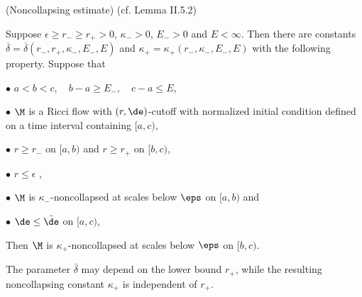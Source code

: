 \begin{lemma}
  \label{lem:kl-establishing-noncollapsing-presence-surgery-existence-kappa-solutions}
(Noncollapsing estimate) (cf. Lemma II.5.2)
\label{II.5.2}

Suppose $\epsilon \ge r_- \ge r_+ >0$, $\kappa_->0$, $E_->0$ and $E<\infty$.
Then there are constants $\overline{\delta} =
\overline{\delta}(r_-,r_+,\kappa_-,E_-,E)$
and $\kappa_+=\kappa_+(r_-,\kappa_-,E_-,E)$ with
the following property.  Suppose that

$\bullet$  $a<b<c,\quad b-a\geq E_-,\quad c-a\leq E$,

$\bullet$  $\M$ is a Ricci flow with $(r,\de)$-cutoff
with normalized initial condition
defined on a time interval containing $[a,c)$,

$\bullet$ $r\geq r_-$ on $[a,b)$ and $r\geq r_+$ on $[b,c)$,

$\bullet$ $r \le \epsilon$ ,

$\bullet$ $\M$ is $\kappa_-$-noncollapsed at scales below
$\eps$ on $[a,b)$ and

$\bullet$ $\de\leq \bar\de$ on $[a,c)$,


Then $\M$ is $\kappa_+$-noncollapsed at scales below $\eps$
on $[b,c)$.
\end{lemma}

\begin{remark}
\label{rem:kl-establishing-noncollapsing-presence-surgery-estimates-kappa-solutions}

The parameter $\bar\delta$ may depend on the lower bound $r_+$, while the resulting noncollapsing constant $\kappa_+$ is independent of $r_+$.
\end{remark}

